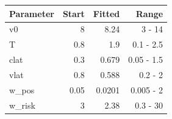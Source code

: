 \begin{tabular}{|l|r|r|r|}
\hline
\textbf{Parameter} & \textbf{Start} & \textbf{Fitted} & \textbf{Range} \\
\hline
v0 & 8 & 8.24 & 3 - 14 \\
T & 0.8 & 1.9 & 0.1 - 2.5 \\
clat & 0.3 & 0.679 & 0.05 - 1.5 \\
vlat & 0.8 & 0.588 & 0.2 - 2 \\
w\_pos & 0.05 & 0.0201 & 0.005 - 2 \\
w\_risk & 3 & 2.38 & 0.3 - 30 \\
\hline
\end{tabular}
